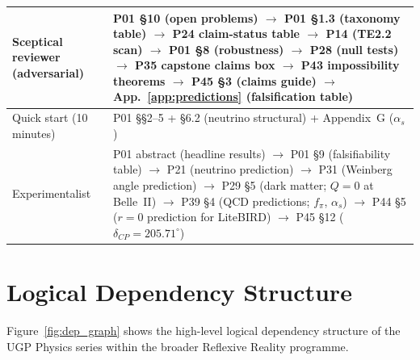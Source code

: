 \documentclass[11pt]{article}
\begin{document}
\begin{table}[H]
{\begin{tabularx}{\textwidth}{@{}p{3.4cm}X@{}}
Sceptical reviewer (adversarial)
  & P01 \S10 (open problems) $\to$ P01 \S1.3 (taxonomy table)
    $\to$ P24 claim-status table $\to$ P14 (TE2.2 scan)
    $\to$ P01 \S8 (robustness) $\to$ P28 (null tests)
    $\to$ P35 capstone claims box $\to$ P43 impossibility theorems
    $\to$ P45 \S3 (claims guide) $\to$ App.~\ref{app:predictions} (falsification table) \\
\midrule
Quick start (10 minutes)
  & P01 \S\S2--5 + \S6.2 (neutrino structural) + Appendix~G ($\alpha_s$) \\
\midrule
Experimentalist
  & P01 abstract (headline results) $\to$ P01 \S9 (falsifiability table)
    $\to$ P21 (neutrino prediction) $\to$ P31 (Weinberg angle prediction)
    $\to$ P29 \S5 (dark matter; $Q=0$ at Belle~II)
    $\to$ P39 \S4 (QCD predictions; $f_\pi$, $\alpha_s$)
    $\to$ P44 \S5 ($r=0$ prediction for LiteBIRD)
    $\to$ P45 \S12 ($\delta_{CP} = 205.71^\circ$) \\
\bottomrule
\end{tabularx}}
\end{table}

\section{Logical Dependency Structure}
\label{sec:deps}

Figure~\ref{fig:dep_graph} shows the high-level logical dependency structure of the
UGP Physics series within the broader Reflexive Reality programme.
\end{document}
